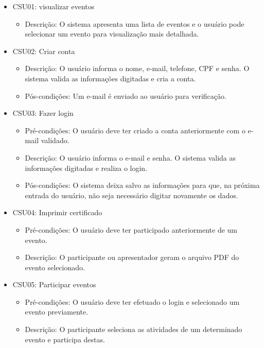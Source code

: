 \begin{itemize}
    \item CSU01: visualizar eventos 
        \begin{itemize}
            \item Descrição: O sistema apresenta uma lista de eventos e o usuário pode selecionar um evento para visualização mais detalhada.
        \end{itemize}
    \item CSU02: Criar conta
    \begin{itemize}
            \item Descrição: O usuário informa o nome, e-mail, telefone, CPF e senha. O sistema valida as informações digitadas e cria a conta.
            \item Pós-condições: Um e-mail é enviado ao usuário para verificação.
        \end{itemize}
    \item CSU03: Fazer login
        \begin{itemize}
            \item Pré-condições: O usuário deve ter criado a conta anteriormente com o e-mail validado.
            \item Descrição: O usuário informa o e-mail e senha. O sistema valida as informações digitadas e realiza o login.
            \item Pós-condições: O sistema deixa salvo as informações para que, na próxima entrada do usuário, não seja necessário digitar novamente os dados.
            \end{itemize}
    \item CSU04: Imprimir certificado
        \begin{itemize}
            \item Pré-condições: O usuário deve ter participado anteriormente de um evento.
            \item Descrição: O participante ou apresentador geram o arquivo PDF do evento selecionado.
        \end{itemize}
    \item CSU05: Participar eventos
        \begin{itemize}
            \item Pré-condições: O usuário deve ter efetuado o login e selecionado um evento previamente.
            \item Descrição: O participante seleciona as atividades de um determinado evento e participa destas.

\end{itemize}
\end{itemize}
